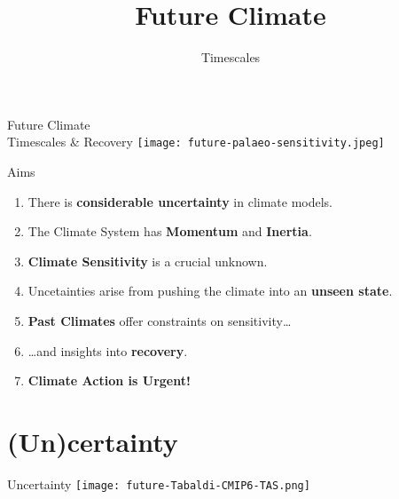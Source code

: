 


\title{Future Climate}
\author{Timescales}




\begin{frame}{Future Climate\\Timescales \& Recovery}
    \texttt{[image: future-palaeo-sensitivity.jpeg]}
\end{frame}

\begin{frame}{Aims}

    \begin{enumerate}
        \item There is \textbf{considerable uncertainty} in climate models.
        \item The Climate System has \textbf{Momentum} and \textbf{Inertia}.
        \item \textbf{Climate Sensitivity} is a crucial unknown.
        \item Uncetainties arise from pushing the climate into an \textbf{unseen state}.
        \item \textbf{Past Climates} offer constraints on sensitivity\dots
        \item \dots and insights into \textbf{recovery}.
        \item \textbf{Climate Action is Urgent!}
    \end{enumerate}

\end{frame}

\section{(Un)certainty}

\begin{frame}{Uncertainty}
    \centering
    \texttt{[image: future-Tabaldi-CMIP6-TAS.png]}
\end{frame}

